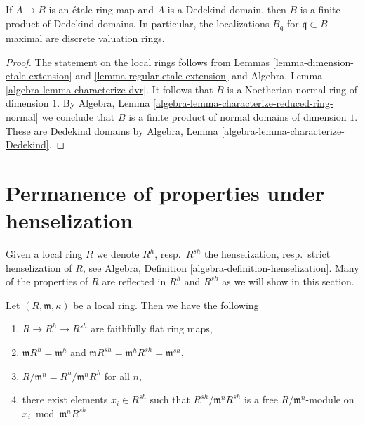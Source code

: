 \begin{lemma}
\label{lemma-Dedekind-etale-extension}
If $A \to B$ is an \'etale ring map and $A$ is a Dedekind domain, then
$B$ is a finite product of Dedekind domains. In particular, the
localizations $B_\mathfrak q$ for $\mathfrak q \subset B$ maximal
are discrete valuation rings.
\end{lemma}

\begin{proof}
The statement on the local rings follows from
Lemmas \ref{lemma-dimension-etale-extension} and
\ref{lemma-regular-etale-extension}
and Algebra, Lemma \ref{algebra-lemma-characterize-dvr}.
It follows that $B$ is a Noetherian normal ring of dimension $1$.
By Algebra, Lemma \ref{algebra-lemma-characterize-reduced-ring-normal}
we conclude that $B$ is a finite product of normal domains of
dimension $1$. These are Dedekind domains by
Algebra, Lemma \ref{algebra-lemma-characterize-Dedekind}.
\end{proof}



\section{Permanence of properties under henselization}
\label{section-permanence-henselization}

\noindent
Given a local ring $R$ we denote $R^h$, resp.\ $R^{sh}$ the henselization,
resp.\ strict henselization of $R$, see
Algebra, Definition \ref{algebra-definition-henselization}.
Many of the properties of $R$ are
reflected in $R^h$ and $R^{sh}$ as we will show in this section.

\begin{lemma}
\label{lemma-dumb-properties-henselization}
Let $(R, \mathfrak m, \kappa)$ be a local ring. Then we have the following
\begin{enumerate}
\item $R \to R^h \to R^{sh}$ are faithfully flat ring maps,
\item $\mathfrak m R^h = \mathfrak m^h$ and
$\mathfrak m R^{sh} = \mathfrak m^h R^{sh} = \mathfrak m^{sh}$,
\item $R/\mathfrak m^n = R^h/\mathfrak m^nR^h$ for all $n$,
\item there exist elements $x_i \in R^{sh}$ such that
$R^{sh}/\mathfrak m^nR^{sh}$ is a free $R/\mathfrak m^n$-module
on $x_i \bmod \mathfrak m^nR^{sh}$.
\end{enumerate}
\end{lemma}

